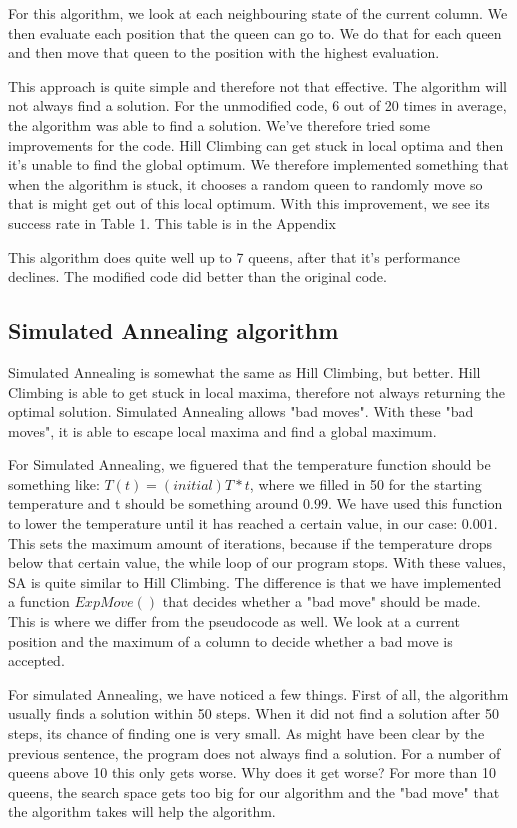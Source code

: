 \documentclass{article}
\begin{document}
	For this algorithm, we look at each neighbouring state of the current column. We then evaluate each position that the queen can go to. We do that for each queen and then move that queen to the position with the highest evaluation.
	
	This approach is quite simple and therefore not that effective. The algorithm will not always find a solution. For the unmodified code, 6 out of 20 times in average, the algorithm was able to find a solution. We've therefore tried some improvements for the code. Hill Climbing can get stuck in local optima and then it's unable to find the global optimum. We therefore implemented something that when the algorithm is stuck, it chooses a random queen to randomly move so that is might get out of this local optimum. With this improvement, we see its success rate in Table 1. This table is in the Appendix

	This algorithm does quite well up to 7 queens, after that it's performance declines. The modified code did better than the original code.
	


	
	\subsection{Simulated Annealing algorithm}
	Simulated Annealing is somewhat the same as Hill Climbing, but better. Hill Climbing is able to get stuck in local maxima, therefore not always returning the optimal solution. Simulated Annealing allows "bad moves". With these "bad moves", it is able to escape local maxima and find a global maximum. 
	
	For Simulated Annealing, we figuered that the temperature function should be something like: $ T(t) = (initial)T * t$, where we filled in 50 for the starting temperature and t should be something around $0.99$. We have used this function to lower the temperature until it has reached a certain value, in our case: $0.001$. This sets the maximum amount of iterations, because if the temperature drops below that certain value, the while loop of our program stops. With these values, SA is quite similar to Hill Climbing. The difference is that we have implemented a function $ExpMove()$ that decides whether a "bad move" should be made. This is where we differ from the pseudocode as well. We look at a current position and the maximum of a column to decide whether a bad move is accepted.
	
	For simulated Annealing, we have noticed a few things. First of all, the algorithm usually finds a solution within 50 steps. When it did not find a solution after 50 steps, its chance of finding one is very small. As might have been clear by the previous sentence, the program does not always find a solution. For a number of queens above 10 this only gets worse. Why does it get worse? For more than 10 queens, the search space gets too big for our algorithm and the "bad move" that the algorithm takes will help the algorithm.	
	
\end{document}

